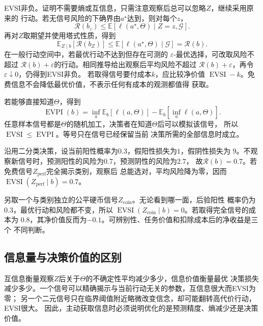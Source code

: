 EVSI非负。证明不需要熵或互信息，只需注意观察后总可以忽略\(Z\)，继续采用原来的
行动。若无信号风险的下确界由\(a^\star\)达到，则对每个\(z\)，
\[
  \mathcal{R}(b_z)
  \leq
  \mathbb{E}[\ell(a^\star,\Theta)\mid Z=z,\mathcal{G}].
\]
再对\(Z\)取期望并使用塔式性质，得到
\[
  \mathbb{E}_{Z\mid b}[\mathcal{R}(b_Z)]
  \leq
  \mathbb{E}[\ell(a^\star,\Theta)\mid\mathcal{G}]
  =
  \mathcal{R}(b).
\]
在一般行动空间中，若最优行动不达到但存在可测的
\(\varepsilon\)-最优选择，可改取风险不超过
\(\mathcal{R}(b)+\varepsilon\)的行动。相同推导给出观察后平均风险不超过
\(\mathcal{R}(b)+\varepsilon\)，再令\(\varepsilon\downarrow0\)，仍得到EVSI非负。
若取得信号要付成本\(k\)，应比较净价值
\(\operatorname{EVSI}-k\)。免费信息不会降低最优价值，不表示任何有成本的观测都值得
获取。

若能够直接知道\(\Theta\)，得到
\begin{equation}
  \operatorname{EVPI}(b)
  =
  \inf_a\mathbb{E}_{b}[\ell(a,\Theta)]
  -
  \mathbb{E}_{b}\left[\inf_a\ell(a,\Theta)\right].
  \label{eq:decision-evpi}
\end{equation}
任意样本信号都是\(\Theta\)的随机加工，决策者在知道\(\Theta\)后可以模拟该信号，
所以\(\operatorname{EVSI}\leq\operatorname{EVPI}\)。等号只在信号已经保留当前
决策所需的全部信息时成立。

\begin{example}[辨别信号与无关信号]
\label{ex:decision-informative-and-irrelevant-signals}
沿用二分类决策，设当前阳性概率为\(0.3\)，假阳性损失为\(1\)，假阴性损失为
\(9\)。不观察新信号时，预测阳性的风险为\(0.7\)，预测阴性的风险为\(2.7\)，
故\(\mathcal{R}(b)=0.7\)。若免费信号\(Z_{\mathrm{perf}}\)完全揭示类别，观察后
总能选对，平均风险降为零，因而
\(\operatorname{EVSI}(Z_{\mathrm{perf}}\mid b)=0.7\)。

另取一个与类别独立的公平硬币信号\(Z_{\mathrm{coin}}\)。无论看到哪一面，后验阳性
概率仍为\(0.3\)，最优行动和风险都不变，所以
\(\operatorname{EVSI}(Z_{\mathrm{coin}}\mid b)=0\)。若取得完全信号的成本为
\(0.8\)，其净价值反而为\(-0.1\)。可辨别性、任务价值和扣除成本后的净收益是三个
不同判断。
\end{example}

\subsection{信息量与决策价值的区别}
互信息衡量观察\(Z\)后关于\(\Theta\)的不确定性平均减少多少，信息价值衡量最优
决策损失减少多少。一个信号可以精确揭示与当前行动无关的参数，互信息很大而EVSI为零；
另一个二元信号只在临界阈值附近略微改变信念，却可能翻转高代价行动，EVSI很大。
因此，主动获取信息时必须说明优化的是预测精度、熵减少还是决策价值。

